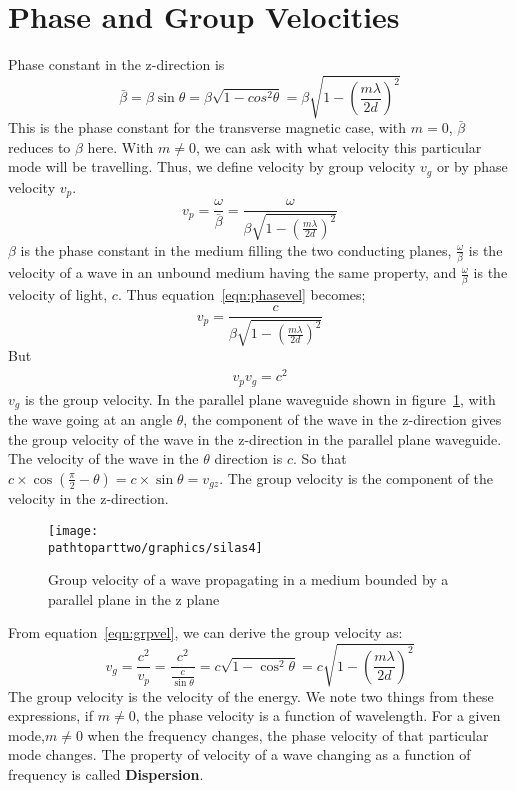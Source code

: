 \section{Phase and Group Velocities}
Phase constant in the z-direction is
\begin{dmath*}
\bar{\beta} = \beta\sin\theta = \beta \sqrt{1- cos^{2}\theta} =\beta\sqrt{1 - \left(\frac{m\lambda}{2d}\right)^{2}}
\end{dmath*}
This is the phase constant for the transverse magnetic case, with $m = 0$, $\bar{\beta}$ reduces to $\beta$ here. With $m\neq 0$, we can ask with what velocity this particular mode will be travelling. Thus, we define velocity by group velocity $v_{g}$ or by phase velocity $v_{p}$. 
\begin{dmath}
 v_{p}=\frac{\omega}{\bar{\beta}} =\frac{\omega}{\beta \sqrt{1 - \left(\frac{m\lambda}{2d}\right)^{2}}}
\label{eqn:phasevel}
\end{dmath}
$\beta$ is the phase constant in the medium filling the two conducting planes, $\frac{\omega}{\beta}$ is the velocity of a wave in an unbound medium having the same property, and $\frac{\omega}{\beta}$ is the velocity of light, $c$. Thus equation~\ref{eqn:phasevel} becomes;
\begin{equation*}
v_{p} =\frac{c}{\beta\sqrt{1 - \left(\frac{m\lambda}{2d}\right)^{2}}}
\end{equation*}
But 
\begin{align}
v_{p} v_{g}= c^{2}
\label{eqn:grpvel}
\end{align}
$v_{g}$ is the group velocity. In the parallel plane waveguide shown in figure~\ref{fig:silas4}, with the wave going at an angle $\theta$, the component of the wave in the z-direction gives the group velocity of the wave in the z-direction in the parallel plane waveguide. The velocity of the wave in the $\theta$ direction is $c$. So that $c\times \cos(\frac{\pi}{2} - \theta)= c\times \sin\theta= v_{gz}$. The group velocity is the component of the velocity in the z-direction.
\begin{figure}[h]
\centering
\texttt{[image: \\pathtoparttwo/graphics/silas4]}
\caption{Group velocity of a wave propagating in a medium bounded by a parallel plane in the z plane}
\label{fig:silas4}
\end{figure}
From equation~\ref{eqn:grpvel}, we can derive the group velocity as:
\begin{dmath}
v_g = \frac{c^2}{v_p} = \frac{c^2}{\frac{c}{\sin\theta}}= c\sqrt{1-\cos^{2}\theta} =c\sqrt{1-\left(\frac{m\lambda}{2d}\right)^{2}}
\label{eqn:grpvel2}
\end{dmath}
The group velocity is the velocity of the energy. We note two things from these expressions, if $m \neq 0$, the phase velocity is a function of wavelength. For a given mode,$m \neq 0$ when the frequency changes, the phase velocity of that particular mode changes. The property of velocity of a wave changing as a function of frequency is called \textbf{Dispersion}. 

